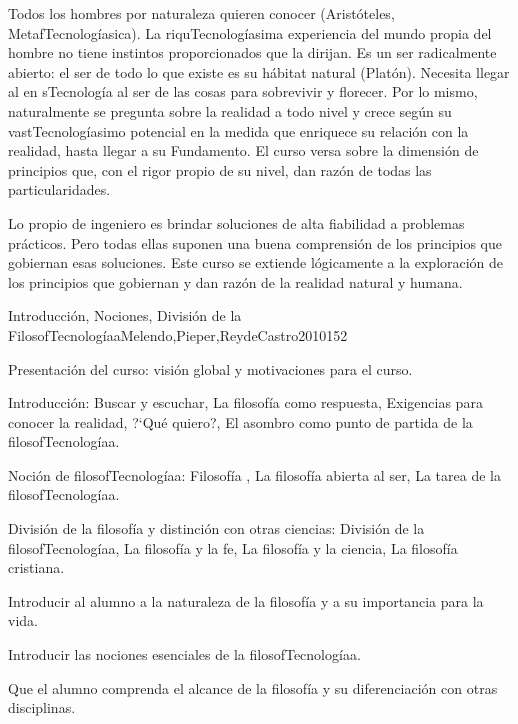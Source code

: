 \begin{syllabus}


\begin{justification}
Todos los hombres por naturaleza quieren conocer  (Aristóteles, MetafTecnologíasica). La riquTecnologíasima experiencia del mundo propia del hombre no tiene instintos proporcionados que la dirijan. Es un ser radicalmente abierto: el ser de todo lo que existe es su  hábitat  natural (Platón). Necesita llegar al  en sTecnología al ser de las cosas para sobrevivir y florecer. Por lo mismo, naturalmente se pregunta sobre la realidad a todo nivel y crece según su vastTecnologíasimo potencial en la medida que enriquece su relación con la realidad, hasta llegar a su Fundamento. El curso versa sobre la dimensión de principios que, con el rigor propio de su nivel, dan razón de todas las particularidades.
\end{justification}

\begin{goals}
\item Lo propio de ingeniero es brindar soluciones de alta fiabilidad a problemas prácticos. Pero todas ellas suponen una buena comprensión de los principios que gobiernan esas soluciones. Este curso se extiende lógicamente a la exploración de los principios que gobiernan y dan razón de la realidad natural y humana.
\end{goals}

\begin{outcomes}
\end{outcomes}

\begin{unit}{Introducción, Nociones, División de la FilosofTecnologíaa}{Melendo,Pieper,ReydeCastro2010}{15}{2}
\begin{topics}
	\item Presentación del curso: visión global y motivaciones para el curso.
	\item Introducción: Buscar y escuchar, La filosofía como respuesta, Exigencias para conocer la realidad, ?`Qué quiero?, El asombro como punto de partida de la filosofTecnologíaa.
	\item Noción de filosofTecnologíaa:  Filosofía , La filosofía abierta al ser, La tarea de la filosofTecnologíaa.
	\item División de la filosofía y distinción con otras ciencias: División de la filosofTecnologíaa, La filosofía y la fe, La filosofía y la ciencia,  La filosofía cristiana.
\end{topics}
\begin{learningoutcomes}
	\item Introducir al alumno a la naturaleza de la filosofía y a su importancia para la vida.
	\item Introducir las nociones esenciales de la filosofTecnologíaa.
	\item Que el alumno comprenda el alcance de la filosofía y su diferenciación con otras disciplinas.
\end{learningoutcomes}
\end{unit}


\end{syllabus}
